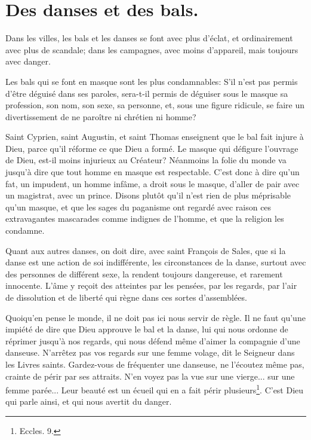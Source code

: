 \documentclass[instructions.tex]{subfiles}
\begin{document}
 
\chapter{Des danses et des bals.}
 
\primo Dans les villes, les bals et les danses se font avec plus d'éclat, et ordinairement avec plus de scandale; dans les campagnes, avec moins d'appareil, mais toujours avec danger.

Les bals qui se font en masque sont les plus condamnables: S'il n'est pas permis d'être déguisé dans ses paroles, sera-t-il permis de déguiser sous le masque sa profession, son nom, son sexe, sa personne, et, sous une figure ridicule, se faire un divertissement de ne paroître ni chrétien ni homme?

Saint Cyprien, saint Augustin, et saint Thomas enseignent que le bal fait injure à Dieu, parce qu'il réforme ce que Dieu a formé. Le masque qui défigure l'ouvrage de Dieu, est-il moins injurieux au Créateur? Néanmoins la folie du monde va jusqu'à dire que tout homme en masque est respectable. C'est donc à dire qu'un fat, un impudent, un homme infâme, a droit sous le masque, d'aller de pair avec un magistrat, avec un prince. Disons plutôt qu'il n'est rien de plus méprisable qu'un masque, et que les sages du paganisme ont regardé avec raison ces extravagantes mascarades comme indignes de l'homme, et que la religion les condamne.

\secundo Quant aux autres danses, on doit dire, avec saint François de Sales, que si la danse est une action de soi indifférente, les circonstances de la danse, surtout avec des personnes de différent sexe, la rendent toujours dangereuse, et rarement innocente. L'âme y reçoit des atteintes par les pensées, par les regards, par l'air de dissolution et de liberté qui règne dans ces sortes d'assemblées.

Quoiqu'en pense le monde, il ne doit pas ici nous servir de règle. Il ne faut qu'une impiété de dire que Dieu approuve le bal et la danse, lui qui nous ordonne de réprimer jusqu'à nos regards, qui nous défend même d'aimer la compagnie d'une danseuse. N'arrêtez pas vos regards sur une femme volage, dit le Seigneur dans les Livres saints. Gardez-vous de fréquenter une danseuse, ne l'écoutez même pas, crainte de périr par ses attraits. N'en voyez pas la vue sur une vierge... sur une femme parée... Leur beauté est un écueil qui en a fait périr plusieurs\footnote{Eccles. 9.}. C'est Dieu qui parle ainsi, et qui nous avertit du danger.
\end{document}
